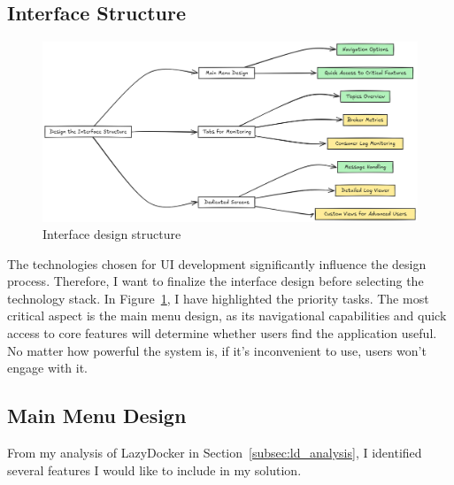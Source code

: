 \documentclass[10pt , a4paper]{report}
\begin{document}
\subsection{Interface Structure}

\begin{figure}[htbp]
    \centering
    \includegraphics[width=1\linewidth]{imgs/InterfaceDesign.png}
    \caption{Interface design structure}
    \label{fig:interface_design}
\end{figure}

The technologies chosen for UI development significantly influence the design process. Therefore, I want to finalize the interface design before selecting the technology stack. In Figure~\ref{fig:interface_design}, I have highlighted the priority tasks. The most critical aspect is the main menu design, as its navigational capabilities and quick access to core features will determine whether users find the application useful. No matter how powerful the system is, if it’s inconvenient to use, users won’t engage with it.

\subsection{Main Menu Design}\label{subsec:main_menu_design}

From my analysis of LazyDocker in Section~\ref{subsec:ld_analysis}, I identified several features I would like to include in my solution.
\end{document}
